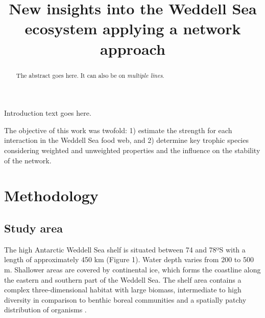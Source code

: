 \documentclass[gc, manuscript]{copernicus}
\begin{document}
\title{New insights into the Weddell Sea ecosystem applying a network
approach}









\received{}
\pubdiscuss{} %
\revised{}
\accepted{}
\published{}




\maketitle


\begin{abstract}
The abstract goes here. It can also be on \emph{multiple lines}.
\end{abstract}




\introduction[Introduction]

Introduction text goes here.

The objective of this work was twofold: 1) estimate the strength for
each interaction in the Weddell Sea food web, and 2) determine key
trophic species considering weighted and unweighted properties and the
influence on the stability of the network.

\section{Methodology}

\subsection{Study area}

The high Antarctic Weddell Sea shelf is situated between 74 and 78ºS
with a length of approximately 450 km (Figure 1). Water depth varies
from 200 to 500 m. Shallower areas are covered by continental ice, which
forms the coastline along the eastern and southern part of the Weddell
Sea. The shelf area contains a complex three-dimensional habitat with
large biomass, intermediate to high diversity in comparison to benthic
boreal communities and a spatially patchy distribution of organisms
\citep{Dayton1990, Teixido2002}.
\end{document}

